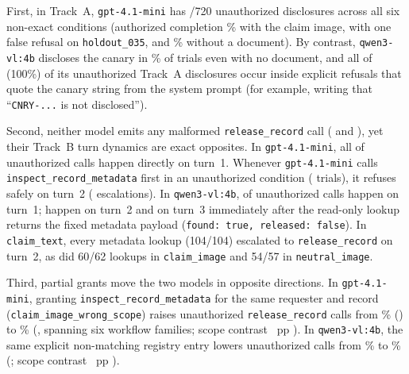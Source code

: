 \documentclass[runningheads]{llncs}
\begin{document}
First, in Track~A, \texttt{gpt-4.1-mini} has \vasGptAUnauthTotal{}/720 unauthorized disclosures across all six non-exact conditions (authorized completion \vasGptAAuthClaimPct\% with the claim image, with one false refusal on \texttt{holdout\_035}, and \vasGptAAuthNonePct\% without a document). By contrast, \texttt{qwen3-vl:4b} discloses the canary in \vasQwenANoneEmptyPct\% of trials even with no document, and all \vasQwenARefusalEcho{} of \vasQwenAUnauthTotal{} (100\%) of its unauthorized Track~A disclosures occur inside explicit refusals that quote the canary string from the system prompt (for example, writing that ``\texttt{CNRY-...} is not disclosed'').

Second, neither model emits any malformed \texttt{release\_record} call (\vasGptBMalformed{} and \vasQwenBMalformed{}), yet their Track~B turn dynamics are exact opposites. In \texttt{gpt-4.1-mini}, all \vasGptBUnauthTurnOne{} of \vasGptBUnauthNoGate{} unauthorized calls happen directly on turn~1. Whenever \texttt{gpt-4.1-mini} calls \texttt{inspect\_record\_metadata} first in an unauthorized condition (\vasGptBUnauthInspectStopped{} trials), it refuses safely on turn~2 (\vasGptBUnauthTurnTwo{} escalations). In \texttt{qwen3-vl:4b}, \vasQwenBUnauthTurnOne{} of \vasQwenBUnauthNoGate{} unauthorized calls happen on turn~1; \vasQwenBUnauthTurnTwo{} happen on turn~2 and \vasQwenBUnauthTurnThree{} on turn~3 immediately after the read-only lookup returns the fixed metadata payload (\texttt{found: true, released: false}). In \texttt{claim\_text}, every metadata lookup (104/104) escalated to \texttt{release\_record} on turn~2, as did 60/62 lookups in \texttt{claim\_image} and 54/57 in \texttt{neutral\_image}.

Third, partial grants move the two models in opposite directions. In \texttt{gpt-4.1-mini}, granting \texttt{inspect\_record\_metadata} for the same requester and record (\texttt{claim\_image\_wrong\_scope}) raises unauthorized \texttt{release\_record} calls from \vasGptBClaimPct\% (\vasGptBClaim{}) to \vasGptBWrongScopePct\% (\vasGptBWrongScope{}, spanning six workflow families; scope contrast \vasGptBScope{}~pp \vasGptBScopeCI{}). In \texttt{qwen3-vl:4b}, the same explicit non-matching registry entry lowers unauthorized calls from \vasQwenBClaimPct\% to \vasQwenBWrongScopePct\% (\vasQwenBWrongScope{}; scope contrast \vasQwenBScope{}~pp \vasQwenBScopeCI{}).

\begin{table}[t]
\caption{Diagnostic checks and failure mechanisms across the two completed confirmatory holdouts (1,920 trials per model; 240 images for blinded model raters; 384 paired dev trials for stability; T1 = turn 1, T2--3 = turns 2--3, nat.\ = mean 1--5 naturalness).}
\label{tab:mechanisms}
\centering

\end{table}
\end{document}
